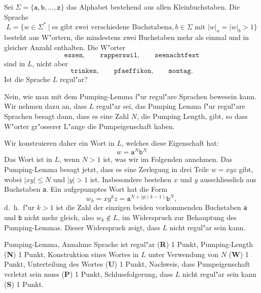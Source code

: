 Sei $\Sigma=\{\texttt{a},\texttt{b},\dots,\texttt{z}\}$ das Alphabet bestehend
aus allen Kleinbuchstaben.
Die Sprache
\[
L=\{w\in\Sigma^*\;|\;\text{es gibt zwei verschiedene Buchstaben
$a,b\in\Sigma$ mit $|w|_a=|w|_b > 1$}\}
\]
besteht aus W"ortern, die mindestens zwei Buchstaben mehr als einmal
und in gleicher Anzahl enthalten.
Die W"orter
\[
\texttt{essen},\qquad
\texttt{rapperswil},\qquad
\texttt{seenachtfest}
\]
sind in $L$, nicht aber
\[
\texttt{trinken},\qquad
\texttt{pfaeffikon},\qquad
\texttt{montag}.
\]
Ist die Sprache $L$ regul"ar?

\begin{loesung}
Nein, wie man mit dem Pumping-Lemma f"ur regul"are Sprachen bewesein kann.
Wir nehmen dazu an, dass $L$ regul"ar sei, das Pumping Lemma f"ur regul"are
Sprachen besagt dann, dass es eine Zahl $N$, die Pumping Length, gibt,
so dass W"orter gr"osserer L"ange die Pumpeigenschaft haben.

Wir konstruieren daher ein Wort in $L$, welches diese Eigenschaft hat:
\[
w=\texttt{a}^N\texttt{b}^N
\]
Das Wort ist in $L$, wenn $N>1$ ist, was wir im Folgenden annehmen.
Das Pumping-Lemma besagt jetzt, dass es eine Zerlegung in drei 
Teile $w=xyz$ gibt, wobei $|xy|\le N$ und $|y|>1$ ist.
Insbesondere bestehen $x$ und $y$ ausschliesslich aus Buchstaben \texttt{a}.
Ein aufgepumptes Wort hat die Form
\[
w_k=xy^kz=\texttt{a}^{N+|y|(k-1)}\texttt{b}^N,
\]
d.~h.~f"ur $k>1$ ist die Zahl der einzigen beiden vorkommenden Buchstaben
\texttt{a} und \texttt{b} nicht mehr gleich, also $w_k\not\in L$,
im Widerspruch zur Behauptung des Pumping-Lemmas.
Dieser Widerspruch zeigt, dass $L$ nicht regul"ar sein kann.
\end{loesung}

\begin{bewertung}
Pumping-Lemma, Annahme Sprache ist regul"ar ({\bf R}) 1 Punkt,
Pumping-Length ({\bf N}) 1 Punkt,
Konstruktion eines Wortes in $L$ unter Verwendung von $N$ ({\bf W}) 1 Punkt,
Unterteilung des Wortes ({\bf U}) 1 Punkt,
Nachweis, dass Pumpeigenschaft verletzt sein muss ({\bf P}) 1 Punkt,
Schlussfolgerung, dass $L$ nicht regul"ar sein kann ({\bf S}) 1 Punkt.
\end{bewertung}

